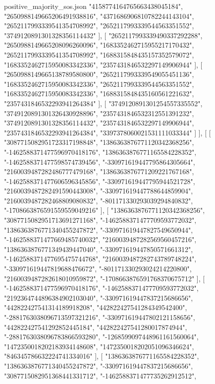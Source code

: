 \begin{filecontents*}[overwrite]{positive_majority_sos.json}
    "4158774164765663438045184",
    "2650988149665206491938816",
    "4371686906810782244143104",
    "2652117993339541354708992",
    "2652117993339544563351552",
    "3749120891301328356114432"
   ],
   [
    "2652117993339490337292288",
    "2650988149665208096260096",
    "1683352462715955217170432",
    "2652117993339541354708992",
    "1688315848435157352579072",
    "1683352462715950083342336",
    "2357431846532297149906944"
   ],
   [
    "2650988149665138789580800",
    "2652117993339549055451136",
    "1683352462715950083342336",
    "2652117993339544563351552",
    "1683352462715950083342336",
    "1688315848435160561221632",
    "2357431846532293941264384"
   ],
   [
    "3749120891301254557335552",
    "3749120891301326430928896",
    "2357431846532312551391232",
    "3749120891301328356114432",
    "2357431846532297149906944",
    "2357431846532293941264384",
    "3397378060021531111033344"
   ]
  ],
  [
   [
    "3087715082951723317198848",
    "1386363876771120342368256",
    "-1462588371477596970418176",
    "1386363876771165584228352",
    "-1462588371477598574739456",
    "-330971619447795864305664",
    "2160039487282486777479168",
    "1386363876771209221767168",
    "-1462588371477606596345856",
    "-330971619447795944521728",
    "2160039487282491590443008",
    "-330971619447788644859904",
    "2160039487282468809080832",
    "-801171330293039294840832",
    "-1708663876591559559049216"
   ],
   [
    "1386363876771120342368256",
    "3087715082951713691271168",
    "-1462588371477709593772032",
    "1386363876771340455247872",
    "-330971619447827549650944",
    "-1462588371477669485740032",
    "2160039487282569560457216",
    "1386363876771349439447040",
    "-330971619447850571661312",
    "-1462588371477695475744768",
    "2160039487282743789748224",
    "-330971619447819688476672",
    "-801171330293024214220800",
    "2160039487282618010959872",
    "-1708663876591768370675712"
   ],
   [
    "-1462588371477596970418176",
    "-1462588371477709593772032",
    "2192364744896384902103040",
    "-330971619447837215686656",
    "442822427541314189918208",
    "442822427541284349542400",
    "-2881763038096713597321216",
    "-330971619447802121158656",
    "442822427541292852445184",
    "442822427541280017874944",
    "-2881763038096783866593280",
    "-1268599097448961161560064",
    "1472350018202183934148608",
    "1472350018202051096346624",
    "846345786632224741334016"
   ],
   [
    "1386363876771165584228352",
    "1386363876771340455247872",
    "-330971619447837215686656",
    "3087715082951368441331712",
    "-1462588371477735262912512",

\end{filecontents*}
